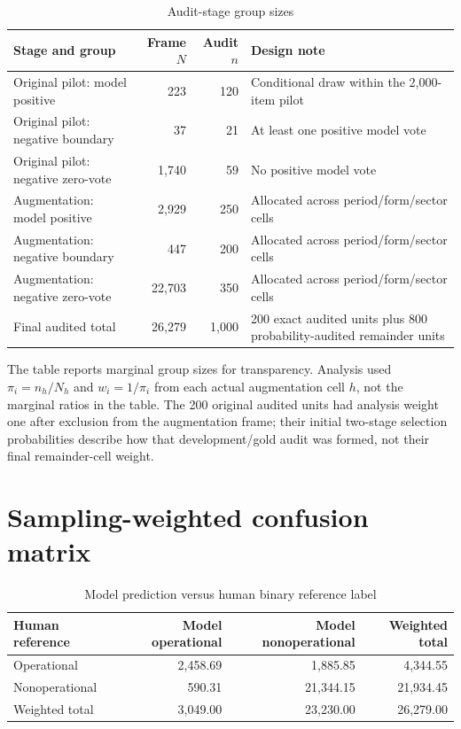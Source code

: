 \documentclass[11pt]{article}
\begin{document}
\begin{table}[htbp]
\centering
\caption{Audit-stage group sizes}
\small
\begin{tabularx}{\textwidth}{@{}Xrrl@{}}
\toprule
Stage and group & Frame $N$ & Audit $n$ & Design note \\
\midrule
Original pilot: model positive & 223 & 120 &
Conditional draw within the 2,000-item pilot \\
Original pilot: negative boundary & 37 & 21 &
At least one positive model vote \\
Original pilot: negative zero-vote & 1,740 & 59 &
No positive model vote \\
\addlinespace
Augmentation: model positive & 2,929 & 250 &
Allocated across period/form/sector cells \\
Augmentation: negative boundary & 447 & 200 &
Allocated across period/form/sector cells \\
Augmentation: negative zero-vote & 22,703 & 350 &
Allocated across period/form/sector cells \\
\midrule
Final audited total & 26,279 & 1,000 &
200 exact audited units plus 800 probability-audited remainder units \\
\bottomrule
\end{tabularx}
\end{table}

The table reports marginal group sizes for transparency. Analysis used
$\pi_i=n_h/N_h$ and $w_i=1/\pi_i$ from each actual augmentation cell $h$, not
the marginal ratios in the table. The 200 original audited units had analysis
weight one after exclusion from the augmentation frame; their initial
two-stage selection probabilities describe how that development/gold audit
was formed, not their final remainder-cell weight.

\section{Sampling-weighted confusion matrix}

\begin{table}[htbp]
\centering
\caption{Model prediction versus human binary reference label}
\small
\begin{tabular}{@{}lrrr@{}}
\toprule
Human reference & Model operational & Model nonoperational & Weighted total \\
\midrule
Operational & 2,458.69 & 1,885.85 & 4,344.55 \\
Nonoperational & 590.31 & 21,344.15 & 21,934.45 \\
\midrule
Weighted total & 3,049.00 & 23,230.00 & 26,279.00 \\
\bottomrule
\end{tabular}
\end{table}
\end{document}
